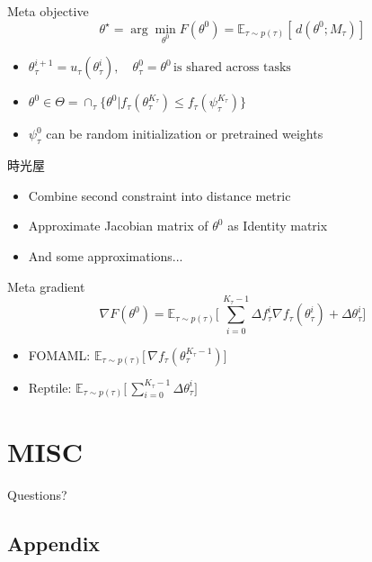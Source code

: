 \documentclass{beamer}
\newcommand{\weib}{\CJKfamily{weib}}
\begin{document}
\begin{frame}
  \begin{block}{Meta objective}
  \[
    \theta^{\star} = \arg\min_{\theta^0} F(\theta^0) = \mathbb{E}_{\tau \sim p(\tau)} [\, d(\theta^0;M_\tau) ]\,
  \]
  \end{block}

  \begin{itemize}
    \item $\theta_{\tau}^{i+1} = u_\tau(\theta^i_\tau), \quad \theta_\tau^0 = \theta^0 \, \text{is shared across tasks}$
    \item $\theta^0 \in \Theta = \cap_\tau \lbrace \theta^0 | f_\tau(\theta_\tau^{K_\tau}) \leq f_\tau(\psi_\tau^{K_\tau}) \rbrace$
    \item $\psi_\tau^0$ can be random initialization or pretrained weights
  \end{itemize}
\end{frame}

\begin{frame}{時光屋}
  \begin{itemize}
    \item Combine second constraint into distance metric
    \item Approximate Jacobian matrix of $\theta^0$ as Identity matrix
    \item And some approximations...
  \end{itemize}
\end{frame}

\begin{frame}{Meta gradient}
  \[
    \nabla F(\theta^0) = \mathbb{E}_{\tau \sim p(\tau)} \Big [\, \sum_{i=0}^{K_\tau - 1} \Delta f_\tau^i \nabla f_\tau(\theta_\tau^i) + \Delta \theta_\tau^i \Big]\,
  \]

  \begin{itemize}
    \item FOMAML: $\mathbb{E}_{\tau \sim p(\tau)} \Big [\, \nabla f_\tau(\theta^{K_\tau -1}_\tau) \Big ]\,$ 
    \item Reptile: $\mathbb{E}_{\tau \sim p(\tau)} \Big [\, \sum_{i=0}^{K_\tau - 1} \Delta \theta_\tau^i \Big ]\,$
  \end{itemize}
\end{frame}

\section{MISC}
\begin{frame}
	\begin{center}
    \LARGE{Questions?}
	\end{center}
\end{frame}


\subsection{Appendix}
\end{document}
